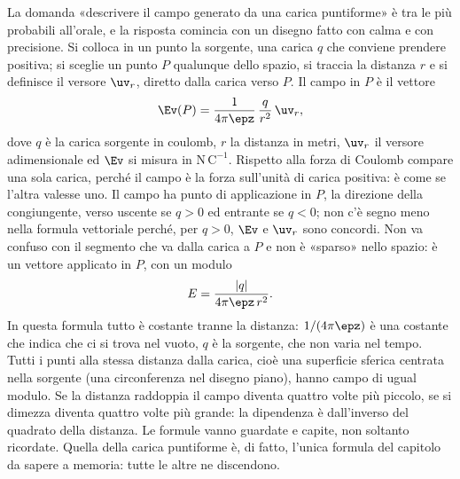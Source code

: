 \documentclass[main.tex]{subfiles}
\begin{document}
La domanda «descrivere il campo generato da una carica puntiforme» è tra le più probabili all'orale, e la risposta comincia con un disegno fatto con calma e con precisione. Si colloca in un punto la sorgente, una carica $q$ che conviene prendere positiva; si sceglie un punto $P$ qualunque dello spazio, si traccia la distanza $r$ e si definisce il versore $\uv_r$, diretto dalla carica verso $P$. Il campo in $P$ è il vettore
\[
\Ev(P)=\frac{1}{4\pi\epz}\,\frac{q}{r^2}\,\uv_r ,
\]
dove $q$ è la carica sorgente in coulomb, $r$ la distanza in metri, $\uv_r$ il versore adimensionale ed $\Ev$ si misura in $\mathrm{N\,C^{-1}}$. Rispetto alla forza di Coulomb compare una sola carica, perché il campo è la forza sull'unità di carica positiva: è come se l'altra valesse uno. Il campo ha punto di applicazione in $P$, la direzione della congiungente, verso uscente se $q>0$ ed entrante se $q<0$; non c'è segno meno nella formula vettoriale perché, per $q>0$, $\Ev$ e $\uv_r$ sono concordi. Non va confuso con il segmento che va dalla carica a $P$ e non è «sparso» nello spazio: è un vettore applicato in $P$, con un modulo
\[
E=\frac{|q|}{4\pi\epz\,r^2}.
\]
In questa formula tutto è costante tranne la distanza: $1/(4\pi\epz)$ è una costante che indica che ci si trova nel vuoto, $q$ è la sorgente, che non varia nel tempo. Tutti i punti alla stessa distanza dalla carica, cioè una superficie sferica centrata nella sorgente (una circonferenza nel disegno piano), hanno campo di ugual modulo. Se la distanza raddoppia il campo diventa quattro volte più piccolo, se si dimezza diventa quattro volte più grande: la dipendenza è dall'inverso del quadrato della distanza. Le formule vanno guardate e capite, non soltanto ricordate. Quella della carica puntiforme è, di fatto, l'unica formula del capitolo da sapere a memoria: tutte le altre ne discendono.
\end{document}
